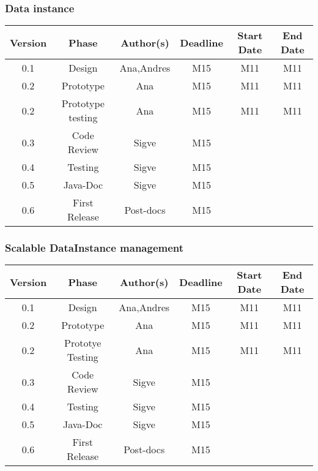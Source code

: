\subsubsection*{Data instance}


\begin{table}[H]
\begin{tabular}{cccccc}
\hline
\textbf{Version} & \textbf{Phase} & \textbf{Author(s)} & \textbf{Deadline} & \textbf{Start Date} & \textbf{End Date}\\
\hline
0.1 & Design & Ana,Andres & M15 & M11 & M11\\
\hline 
0.2 & Prototype & Ana & M15 & M11 & M11\\
\hline 
0.2 & Prototype testing & Ana & M15 & M11 & M11\\
\hline 
0.3 & Code Review & Sigve & M15 &  & \\
\hline 
0.4 & Testing & Sigve & M15 & & \\
\hline 
0.5 & Java-Doc  & Sigve & M15 &  & \\
\hline 
0.6 & First Release & Post-docs & M15 &  & \\
\hline
\end{tabular}
\end{table}

\subsubsection*{Scalable DataInstance management}

\begin{table}[H]
\begin{tabular}{cccccc}
\hline
\textbf{Version} & \textbf{Phase} & \textbf{Author(s)} & \textbf{Deadline} & \textbf{Start Date} & \textbf{End Date}\\
\hline
0.1 & Design & Ana,Andres & M15 & M11 & M11\\
\hline 
0.2 & Prototype & Ana & M15 & M11 & M11\\
\hline 
0.2& Prototye Testing & Ana & M15 & M11 & M11\\
\hline 
0.3 & Code Review & Sigve & M15 &  & \\
\hline 
0.4 & Testing & Sigve & M15 &  & \\
\hline 
0.5 & Java-Doc  & Sigve & M15 &  & \\
\hline 
0.6 & First Release & Post-docs & M15 &  & \\
\hline
\end{tabular}
\end{table}